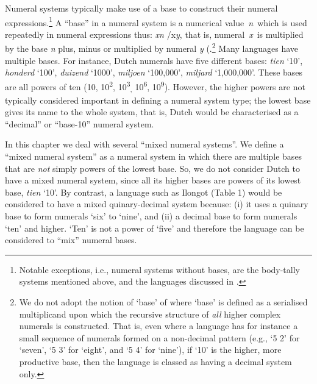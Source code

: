 Numeral systems typically make use of a base to construct their numeral expressions.\footnote{{}   Notable exceptions, i.e., numeral systems without bases, are the body-tally systems mentioned above, and the languages discussed in \citet[17-22]{Hammarstrom2010}.} A ``base'' in a numeral system is a numerical value~\textit{n~}which is used repeatedly in numeral expressions thus: \textit{xn {\textpm}}/x\textit{y}, that is, numeral~\textit{x}~is multiplied by the base \textit{n} plus, minus or multiplied by numeral \textit{y} (\citet{Comrie2005}\citet[15]{Hammarstrom2010}.\footnote{We do not adopt the notion of `base' of \citet{Greenberg1978} where `base' is defined as a serialised multiplicand upon which the recursive structure of \textit{all} higher complex numerals is constructed. That is, even where a language has for instance a small sequence of numerals formed on a non-decimal pattern (e.g., `5 2' for `seven', `5 3' for `eight', and `5 4' for `nine'),  if `10' is the higher, more productive base, then the language is classed as having a decimal system only.}  Many languages have multiple bases. For instance, Dutch numerals have five different bases: \textit{tien} `10', \textit{honderd} `100', \textit{duizend} `1000', \textit{miljoen} `100,000', \textit{miljard} `1,000,000'. These bases are all powers of ten (10, 10\textsuperscript{2}, 10\textsuperscript{3}\textsubscript{,} 10\textsuperscript{6}, 10\textsuperscript{9}). However, the higher powers are not typically considered important in defining a numeral system type; the lowest base gives its name to the whole system, that is, Dutch would be characterised as a ``decimal'' or ``base-10'' numeral system.

In this chapter we deal with several ``mixed numeral systems''. We define a ``mixed numeral system'' as a numeral system in which there are multiple bases that are \textit{not} simply powers of the lowest base. So, we do not consider Dutch to have a mixed numeral system, since all its higher bases are powers of its lowest base, \textit{tien} `10'. By contrast, a language such as Ilongot (Table 1) would be considered to have a mixed quinary-decimal system because: (i) it uses a quinary base to form numerals `six' to `nine', and (ii) a decimal base to form numerals `ten' and higher. `Ten' is not a power of `five' and therefore the language can be considered to ``mix'' numeral bases.




